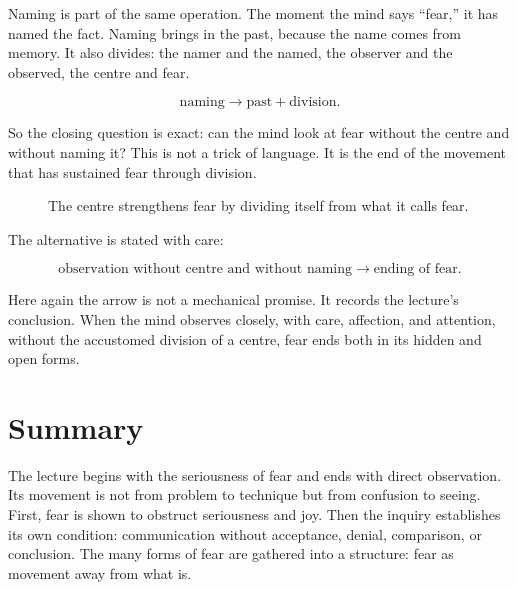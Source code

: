 Naming is part of the same operation. The moment the mind says ``fear,'' it has named the fact. Naming brings in the past, because the name comes from memory. It also divides: the namer and the named, the observer and the observed, the centre and fear.

\begin{equation}
\text{naming}
\longrightarrow
\text{past} + \text{division}.
\end{equation}

So the closing question is exact: can the mind look at fear without the centre and without naming it? This is not a trick of language. It is the end of the movement that has sustained fear through division.

\begin{figure}
\centering
{}
\caption{The centre strengthens fear by dividing itself from what it calls fear.}
\end{figure}

The alternative is stated with care:

\begin{equation}
\text{observation without centre and without naming}
\longrightarrow
\text{ending of fear}.
\end{equation}

Here again the arrow is not a mechanical promise. It records the lecture's conclusion. When the mind observes closely, with care, affection, and attention, without the accustomed division of a centre, fear ends both in its hidden and open forms.

\section{Summary}

The lecture begins with the seriousness of fear and ends with direct observation. Its movement is not from problem to technique but from confusion to seeing. First, fear is shown to obstruct seriousness and joy. Then the inquiry establishes its own condition: communication without acceptance, denial, comparison, or conclusion. The many forms of fear are gathered into a structure: fear as movement away from what is.

